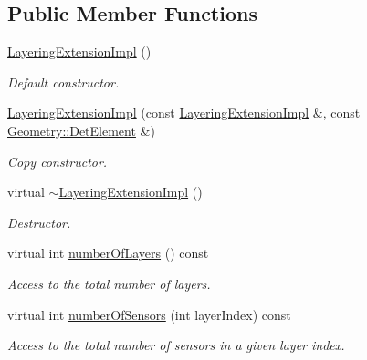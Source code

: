 \subsection*{Public Member Functions}
\begin{DoxyCompactItemize}
\item 
\hyperlink{class_d_d4hep_1_1_d_d_rec_1_1_layering_extension_impl_a870512f3f48cb5ad014fbe822a50be67}{LayeringExtensionImpl} ()
\begin{DoxyCompactList}\small\item\em Default constructor. \item\end{DoxyCompactList}\item 
\hyperlink{class_d_d4hep_1_1_d_d_rec_1_1_layering_extension_impl_aa8410cb9758c1ab2aeaa4a02478c3ed0}{LayeringExtensionImpl} (const \hyperlink{class_d_d4hep_1_1_d_d_rec_1_1_layering_extension_impl}{LayeringExtensionImpl} \&, const \hyperlink{class_d_d4hep_1_1_geometry_1_1_det_element}{Geometry::DetElement} \&)
\begin{DoxyCompactList}\small\item\em Copy constructor. \item\end{DoxyCompactList}\item 
virtual \hyperlink{class_d_d4hep_1_1_d_d_rec_1_1_layering_extension_impl_a12c9038ed17e445cf503abb692e87657}{$\sim$LayeringExtensionImpl} ()
\begin{DoxyCompactList}\small\item\em Destructor. \item\end{DoxyCompactList}\item 
virtual int \hyperlink{class_d_d4hep_1_1_d_d_rec_1_1_layering_extension_impl_a531a938c96eb801d0aa9bc540fd7ae1d}{numberOfLayers} () const 
\begin{DoxyCompactList}\small\item\em Access to the total number of layers. \item\end{DoxyCompactList}\item 
virtual int \hyperlink{class_d_d4hep_1_1_d_d_rec_1_1_layering_extension_impl_a1cc4193b9f53354254635eed6e3f11ce}{numberOfSensors} (int layerIndex) const 
\begin{DoxyCompactList}\small\item\em Access to the total number of sensors in a given layer index. \item\end{DoxyCompactList}\item 

\end{DoxyCompactItemize}
